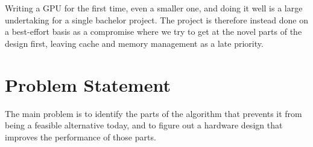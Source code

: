 		Writing a GPU for the first time, even a smaller one, and doing it well is
		a large undertaking for a single bachelor project. The project is therefore
		instead done on a best-effort basis as a compromise where we try to get at
		the novel parts of the design first, leaving cache and memory management as
		a late priority.

	\section{Problem Statement}


		The main problem is to identify the parts of the algorithm that
		prevents it from being a feasible alternative today, and to figure out a
		hardware design that improves the performance of those parts.
